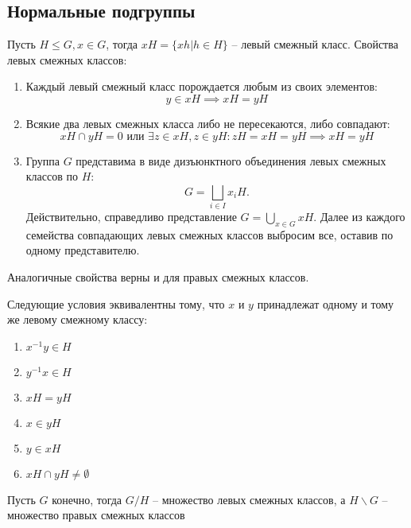 
\subsection{Нормальные подгруппы}

\begin{reminder}
    Пусть $H \leq G, x \in G$, тогда $xH = \{xh | h \in H\}$ -- левый смежный класс. Свойства левых смежных классов:

\begin{enumerate}
    \item Каждый левый смежный класс порождается любым из своих элементов: $$y \in xH \implies xH = yH$$
    \item Всякие два левых смежных класса либо не пересекаются, либо совпадают: $$xH \cap yH = 0 \text{ или } 
    \exists z \in xH, z \in yH: zH = xH = yH \implies xH = yH$$
    \item Группа $G$ представима в виде дизъюнктного объединения левых смежных классов по $H$: $$G = 
    \bigsqcup_{i \in I} x_iH.$$ 
    Действительно, справедливо представление $G = \bigcup_{x \in G} xH$. Далее из каждого семейства 
    совпадающих левых смежных классов выбросим все, оставив по одному представителю.
\end{enumerate}
\end{reminder}

\begin{note}
    Аналогичные свойства верны и  для правых смежных классов.
\end{note}

\begin{theorem}
    Следующие условия эквивалентны тому, что $x$ и $y$ принадлежат одному и тому же левому смежному классу:
    \begin{enumerate}
        \item $x^{-1}y \in H$
        \item $y^{-1}x \in H$
        \item $xH = yH$
        \item $x \in yH$
        \item $y \in xH$
        \item $xH \cap yH \neq \emptyset$
    \end{enumerate}
\end{theorem}

\begin{definition}
    Пусть $G$ конечно, тогда $G/H$ -- множество левых смежных классов, а $H \backslash G$ -- 
    множество правых смежных классов
\end{definition}

